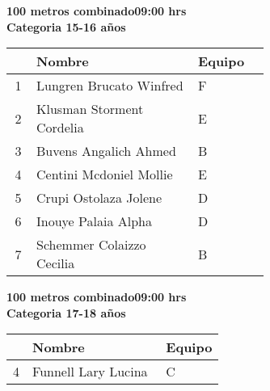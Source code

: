 \begin{minipage}{0.95\linewidth}\vspace{0.5cm} 
\begin{flushleft}
\textbf{
\hspace{-0.15cm}100 metros combinado\hspace{1.5cm}09:00 hrs \\Categoria 15-16 años}\vspace{-0.2cm} 
\end{flushleft}
\begin{tabular}{cp{0.63\linewidth}l}
\hline
& \textbf{Nombre} & \textbf{Equipo} \\ \hline
1 & Lungren Brucato Winfred & F \\ 
2 & Klusman Storment Cordelia & E \\ 
3 & Buvens Angalich Ahmed & B \\ 
4 & Centini Mcdoniel Mollie & E \\ 
5 & Crupi Ostolaza Jolene & D \\ 
6 & Inouye Palaia Alpha & D \\ 
7 & Schemmer Colaizzo Cecilia & B \\ 
\end{tabular}
\end{minipage}
\begin{minipage}{0.95\linewidth}\vspace{0.5cm} 
\begin{flushleft}
\textbf{
\hspace{-0.15cm}100 metros combinado\hspace{1.5cm}09:00 hrs \\Categoria 17-18 años}\vspace{-0.2cm} 
\end{flushleft}
\begin{tabular}{cp{0.63\linewidth}l}
\hline
& \textbf{Nombre} & \textbf{Equipo} \\ \hline
4 & Funnell Lary Lucina & C \\ 
\end{tabular}
\end{minipage}
